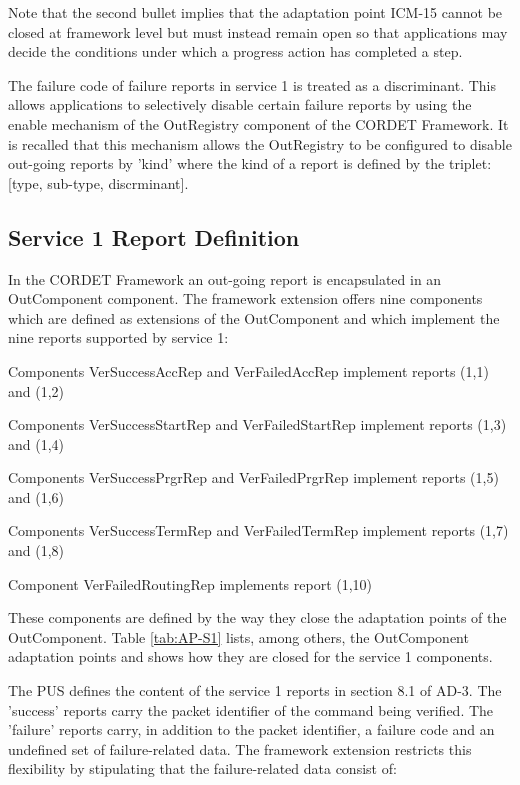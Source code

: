 \documentclass[a4paper,10pt]{article}
\newenvironment{fw_itemize}						%
{\begin{itemize}
  \setlength{\itemsep}{1mm}
  \setlength{\parskip}{0pt}
  \setlength{\parsep}{0pt}}
{\end{itemize}}
\begin{document}
Note that the second bullet implies that the adaptation point ICM-15 cannot be closed at framework level but must instead remain open so that applications may decide the conditions under which a progress action has completed a step.

The failure code of failure reports in service 1 is treated as a discriminant. This allows applications to selectively disable certain failure reports by using the enable mechanism of the OutRegistry component of the CORDET Framework. It is recalled that this mechanism allows the OutRegistry to be configured to disable out-going reports by 'kind' where the kind of a report is defined by the triplet: [type, sub-type, discrminant]. 


\subsection{Service 1 Report Definition}\label{sec:serv1RepDef}
In the CORDET Framework an out-going report is encapsulated in an OutComponent component. The framework extension offers nine components which are defined as extensions of the OutComponent and which implement the nine reports supported by service 1:

\begin{fw_itemize}
\item Components VerSuccessAccRep and VerFailedAccRep implement reports (1,1) and (1,2) 
\item Components VerSuccessStartRep and VerFailedStartRep implement reports (1,3) and (1,4) 
\item Components VerSuccessPrgrRep and VerFailedPrgrRep implement reports (1,5) and (1,6) 
\item Components VerSuccessTermRep and VerFailedTermRep implement reports (1,7) and (1,8) 
\item Component VerFailedRoutingRep implements report (1,10)
\end{fw_itemize}

These components are defined by the way they close the adaptation points of the OutComponent. Table \ref{tab:AP-S1} lists, among others, the OutComponent adaptation points and shows how they are closed for the service 1 components.

The PUS defines the content of the service 1 reports in section 8.1 of AD-3. The 'success' reports carry the packet identifier of the command being verified. The 'failure' reports carry, in addition to the packet identifier, a failure code and an undefined set of failure-related data. The framework extension restricts this flexibility by stipulating that the failure-related data consist of: 
\end{document}
